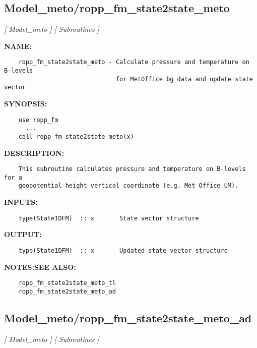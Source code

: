 \subsection{Model\_meto/ropp\_fm\_state2state\_meto}
\textsl{[ Model\_meto ]}
\textsl{[ Subroutines ]}

\label{ch:robo61}
\label{ch:Model_meto_ropp_fm_state2state_meto}
\textbf{NAME:}\hspace{0.08in}\begin{Verbatim}
    ropp_fm_state2state_meto - Calculate pressure and temperature on B-levels 
                               for MetOffice bg data and update state vector
\end{Verbatim}
\textbf{SYNOPSIS:}\hspace{0.08in}\begin{Verbatim}
    use ropp_fm
      ...
    call ropp_fm_state2state_meto(x)
\end{Verbatim}
\textbf{DESCRIPTION:}\hspace{0.08in}\begin{Verbatim}
    This subroutine calculates pressure and temperature on B-levels for a 
    geopotential height vertical coordinate (e.g. Met Office UM). 
\end{Verbatim}
\textbf{INPUTS:}\hspace{0.08in}\begin{Verbatim}
    type(State1DFM)  :: x       State vector structure
\end{Verbatim}
\textbf{OUTPUT:}\hspace{0.08in}\begin{Verbatim}
    type(State1DFM)  :: x       Updated state vector structure
\end{Verbatim}
\textbf{NOTES:}\hspace{0.08in}\textbf{SEE ALSO:}\hspace{0.08in}\begin{Verbatim}
    ropp_fm_state2state_meto_tl
    ropp_fm_state2state_meto_ad
\end{Verbatim}
\subsection{Model\_meto/ropp\_fm\_state2state\_meto\_ad}
\textsl{[ Model\_meto ]}
\textsl{[ Subroutines ]}

